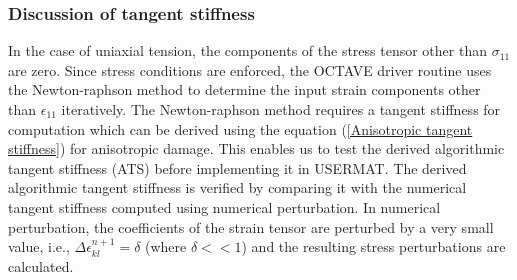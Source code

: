 \documentclass[12pt,twoside]{report}
\begin{document}
\subsubsection{Discussion of tangent stiffness}
\indent\indent\indent In the case of uniaxial tension, the components of the stress tensor other than $\sigma_{11}$ are zero. Since stress conditions are enforced, the OCTAVE driver routine uses the Newton-raphson method to determine the input strain components other than $\epsilon_{11}$ iteratively. The Newton-raphson method requires a tangent stiffness for computation which can be derived using the equation (\ref{Anisotropic tangent stiffness}) for anisotropic damage. This enables us to test the derived algorithmic tangent stiffness (ATS) before implementing it in USERMAT. The derived algorithmic tangent stiffness is verified by comparing it with the numerical tangent stiffness computed using numerical perturbation. In numerical perturbation, the coefficients of the strain tensor are perturbed by a very small value, i.e.,  $\Delta\epsilon_{kl}^{n+1} = \delta$ (where $\delta<<1$) and the resulting stress perturbations are calculated. 
\end{document}

